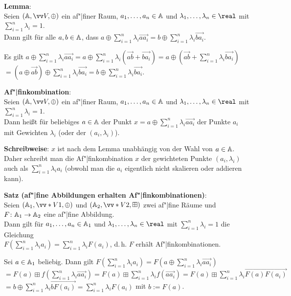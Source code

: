 \textbf{Lemma}:\\
Seien $(\AA, \vec{V}, \oplus)$ ein af"|finer Raum,
$a_1, \dotsc, a_n \in \AA$ und $\lambda_1, \dotsc, \lambda_n \in \real$
mit $\sum_{i=1}^n \lambda_i = 1$.\\
Dann gilt für alle $a, b \in \AA$, dass
$a \oplus \sum_{i=1}^n \lambda_i \vec{aa_i} = b \oplus \sum_{i=1}^n \lambda_i \vec{ba_i}$.

\begin{Beweis}
    Es gilt
    $a \oplus \sum_{i=1}^n \lambda_i \vec{aa_i}
    = a \oplus \sum_{i=1}^n \lambda_i (\vec{ab} + \vec{ba_i})
    = a \oplus (\vec{ab} + \sum_{i=1}^n \lambda_i \vec{ba_i})$\\
    $= (a \oplus \vec{ab}) \oplus \sum_{i=1}^n \lambda_i \vec{ba_i}
    = b \oplus \sum_{i=1}^n \lambda_i \vec{ba_i}$.
\end{Beweis}

\linie

\textbf{Af"|finkombination}:\\
Seien $(\AA, \vec{V}, \oplus)$ ein af"|finer Raum,
$a_1, \dotsc, a_n \in \AA$ und $\lambda_1, \dotsc, \lambda_n \in \real$
mit $\sum_{i=1}^n \lambda_i = 1$.\\
Dann heißt für beliebiges $a \in \AA$
der Punkt $x = a \oplus \sum_{i=1}^n \lambda_i \vec{aa_i}$ 
der Punkte $a_i$ mit Gewichten $\lambda_i$
(oder der  $(a_i, \lambda_i)$).

\textbf{Schreibweise}:
$x$ ist nach dem Lemma unabhängig von der Wahl von $a \in \AA$.
Daher schreibt man die Af"|finkombination $x$ der gewichteten Punkte $(a_i, \lambda_i)$ auch
als $\sum_{i=1}^n \lambda_i a_i$
(obwohl man die $a_i$ eigentlich nicht skalieren oder addieren kann).

\linie

\textbf{Satz (af"|fine Abbildungen erhalten Af"|finkombinationen)}:\\
Seien $(\AA_1, \vec*{V}{1}, \oplus)$ und $(\AA_2, \vec*{V}{2}, \boxplus)$ zwei af"|fine Räume
und $F\colon \AA_1 \to \AA_2$ eine af"|fine Abbildung.\\
Dann gilt für $a_1, \dotsc, a_n \in \AA_1$ und $\lambda_1, \dotsc, \lambda_n \in \real$
mit $\sum_{i=1}^n \lambda_i = 1$
die Gleichung\\
$F(\sum_{i=1}^n \lambda_i a_i) = \sum_{i=1}^n \lambda_i F(a_i)$,
d.\,h. $F$ erhält Af"|finkombinationen.

\begin{Beweis}
    Sei $a \in \AA_1$ beliebig.
    Dann gilt
    $F(\sum_{i=1}^n \lambda_i a_i)
    = F(a \oplus \sum_{i=1}^n \lambda_i \vec{aa_i})$\\
    $= F(a) \boxplus f(\sum_{i=1}^n \lambda_i \vec{aa_i})
    = F(a) \boxplus \sum_{i=1}^n \lambda_i f(\vec{aa_i})
    = F(a) \boxplus \sum_{i=1}^n \lambda_i \vec{F(a)F(a_i)}$\\
    $= b \oplus \sum_{i=1}^n \lambda_i \vec{b F(a_i)}
    = \sum_{i=1}^n \lambda_i F(a_i)$
    mit $b := F(a)$.
\end{Beweis}


